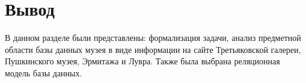 \section*{Вывод}
В данном разделе были представлены: формализация задачи, анализ предметной области базы данных музея в виде информации на сайте Третьяковской галереи, Пушкинского музея, Эрмитажа и Лувра. Также была выбрана реляционная модель базы данных.


%

%
%
%
%
